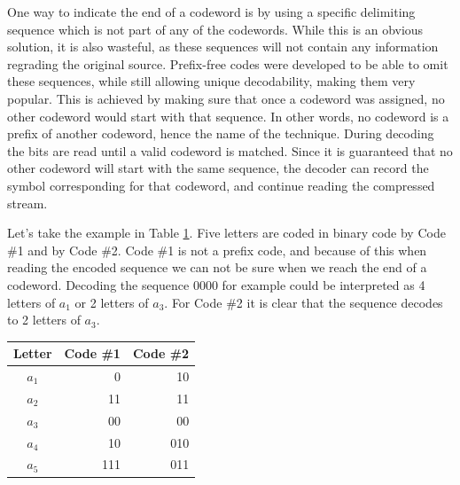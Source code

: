       One way to indicate the end of a codeword is by using a specific delimiting sequence which is not part of any of the codewords. While this is an obvious solution, it is also wasteful, as these sequences will not contain any information regrading the original source. Prefix-free codes were developed to be able to omit these sequences, while still allowing unique decodability, making them very popular. This is achieved by making sure that once a codeword was assigned, no other codeword would start with that sequence. In other words, no codeword is a prefix of another codeword, hence the name of the technique. During decoding the bits are read until a valid codeword is matched. Since it is guaranteed that no other codeword will start with the same sequence, the decoder can record the symbol corresponding for that codeword, and continue reading the compressed stream.
      
      Let's take the example in Table \ref{tab:prefix}. Five letters are coded in binary code by Code \#1 and by Code \#2. Code \#1 is not a prefix code, and because of this when reading the encoded sequence we can not be sure when we reach the end of a codeword. Decoding the sequence 0000 for example could be interpreted as 4 letters of $a_1$ or 2 letters of $a_3$. For Code \#2 it is clear that the sequence decodes to 2 letters of $a_3$.
  
      \begin{table}
        \centering
        \begin{tabular}{crr}
          \toprule
          Letter & Code \#1 & Code \#2 \\
          \midrule
          $a_1$ & 0	& 10 \\
          $a_2$ & 11	& 11 \\
          $a_3$ & 00	& 00 \\
          $a_4$ & 10 	& 010 \\
          $a_5$ & 111	& 011 \\
          \bottomrule
        \end{tabular}
        \label{tab:prefix}
      \end{table}
  
